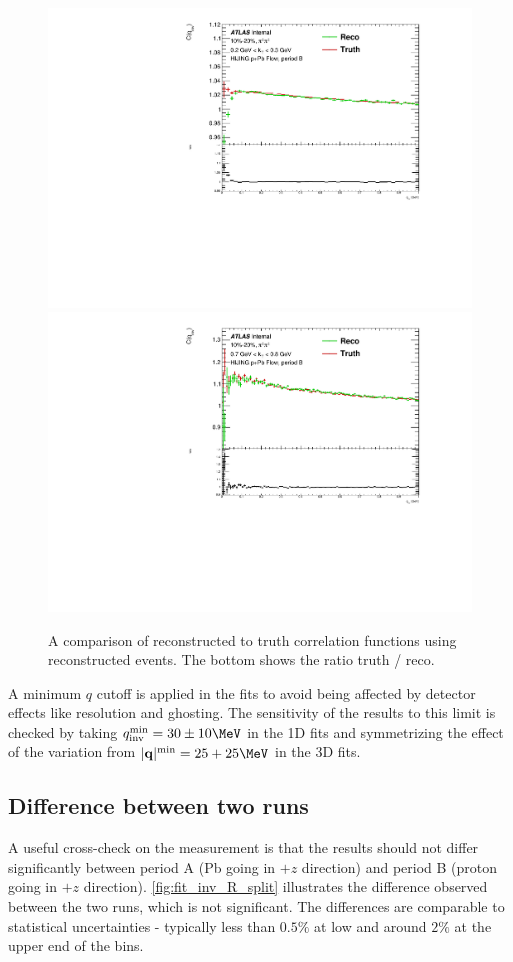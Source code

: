 \begin{figure}[t]
\begin{minipage}[t]{1.0\textwidth}
\centering
\includegraphics[width=.49\linewidth]{Cqinv_hijing_reco_vs_truth_cent3_e3_kt1.pdf}
\includegraphics[width=.49\linewidth]{Cqinv_hijing_reco_vs_truth_cent3_e3_kt6.pdf}
\end{minipage}
\caption{A comparison of reconstructed to truth correlation functions using reconstructed \Hijing events.
The bottom shows the ratio truth / reco.}
\label{fig:2pc_effects}
\end{figure}

A minimum $q$ cutoff is applied in the fits to avoid being affected by detector effects like resolution and ghosting.
The sensitivity of the results to this limit is checked by taking $\qinv^\textrm{min} = 30 \pm 10 \MeV$ in the 1D fits and symmetrizing the effect of the variation from $|\mathbf{q}|^\textrm{min} = 25 + 25 \MeV$ in the 3D fits.

\subsection{Difference between two runs}

A useful cross-check on the measurement is that the results should not differ significantly between period A (Pb going in $+z$ direction) and period B (proton going in $+z$ direction).
\cref{fig:fit_inv_R_split} illustrates the difference observed between the two runs, which is not significant.
The differences are comparable to statistical uncertainties - typically less than $0.5\%$ at low \kt and around $2\%$ at the upper end of the \kt bins.

